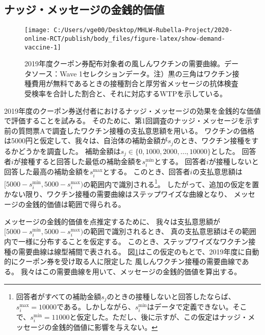 \documentclass[
  11pt,
  a4paper,
]{article}
\begin{document}
\hypertarget{econvalue}{%
\subsection{ナッジ・メッセージの金銭的価値}\label{econvalue}}

\begin{figure}[t]
\texttt{[image: C:/Users/vge00/Desktop/MHLW-Rubella-Project/2020-online-RCT/publish/body\_files/figure-latex/show-demand-vaccine-1]} \caption{2019年度クーポン券配布対象者の風しんワクチンの需要曲線。データソース：Wave 1セレクションデータ。注）黒の三角はワクチン接種費用が無料であるときの接種割合と厚労省メッセージの抗体検査受検率を合計した割合と、それに対応するWTPを示している。}\label{fig:show-demand-vaccine}
\end{figure}

2019年度のクーポン券送付者におけるナッジ・メッセージの効果を金銭的な価値で評価することを試みる。
そのために、第1回調査のナッジ・メッセージを示す前の質問票Aで調査したワクチン接種の支払意思額を用いる。
ワクチンの価格は5000円と仮定して、我々は、自治体の補助金額が\(s_j\)のとき、ワクチン接種をするかどうかを調査した。
補助金額は\(s_j \in \{0, 1000, 2000, \ldots, 10000\}\)とした。
回答者\(i\)が接種すると回答した最低の補助金額を\(s_i^{\text{min}}\)とする。
回答者\(i\)が接種しないと回答した最高の補助金額を\(s_i^{\text{max}}\)とする。
このとき、回答者\(i\)の支払意思額は
\([5000 - s_i^{\text{min}}, 5000 - s_i^{\text{max}})\)の範囲内で識別される\footnote{回答者がすべての補助金額\(s_j\)のときの接種しないと回答したならば、\(s_i^{\text{max}} = 10000\)である。しかしながら、\(s_i^{\text{min}}\)はデータで定義できない。そこで、\(s_i^{\text{min}} = 11000\)と仮定した。ただし、後に示すが、この仮定はナッジ・メッセージの金銭的価値に影響を与えない。}。
したがって、追加の仮定を置かない限り、ワクチン接種の需要曲線はステップワイズな曲線となり、
メッセージの金銭的価値は範囲で得られる。

メッセージの金銭的価値を点推定するために、
我々は支払意思額が\([5000 - s_i^{\text{min}}, 5000 - s_i^{\text{max}})\)の範囲で識別されるとき、
真の支払意思額はその範囲内で一様に分布することを仮定する。
このとき、ステップワイズなワクチン接種の需要曲線は線型補間で表される。
図\ref{fig:show-demand-vaccine}はこの仮定のもとで、2019年度に自動的にクーポン券を受け取る人に限定した
風しんワクチン接種の需要曲線である。
我々はこの需要曲線を用いて、メッセージの金銭的価値を算出する。
\end{document}
